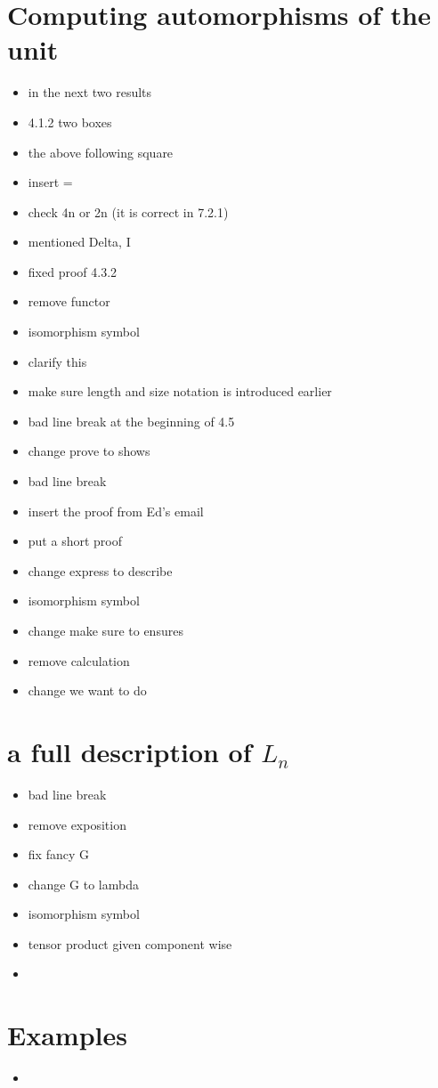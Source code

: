 \documentclass{amsart}
\begin{document}
\section{Computing automorphisms of the unit}
\begin{itemize}
\item in the next two results
\item 4.1.2 two boxes
\item the above following square
\item insert =
\item check 4n or 2n (it is correct in 7.2.1)
\item mentioned Delta, I
\item fixed proof 4.3.2
\item remove functor


\item isomorphism symbol
\item clarify this
\item make sure length and size notation is introduced earlier
\item bad line break at the beginning of 4.5
\item change prove to shows
\item bad line break
\item insert the proof from Ed's email
\item put a short proof

\item change express to describe

\item isomorphism symbol
\item change make sure to ensures
\item remove calculation
\item change we want to do
\end{itemize}

\section{a full description of $L_n $}
\begin{itemize}
\item bad line break
\item remove exposition
\item fix fancy G
\item change G to lambda
\item isomorphism symbol
\item tensor product given component wise


\item 
\end{itemize}
\section{Examples}
\begin{itemize}
\item 
\end{itemize}
\end{document}
